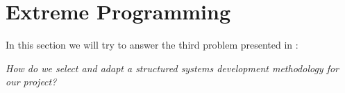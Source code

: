 \section{Extreme Programming}
In this section we will try to answer the third problem presented in :
\begin{center}
	\textit{How do we select and adapt a structured systems development methodology for our project?}
\end{center}
